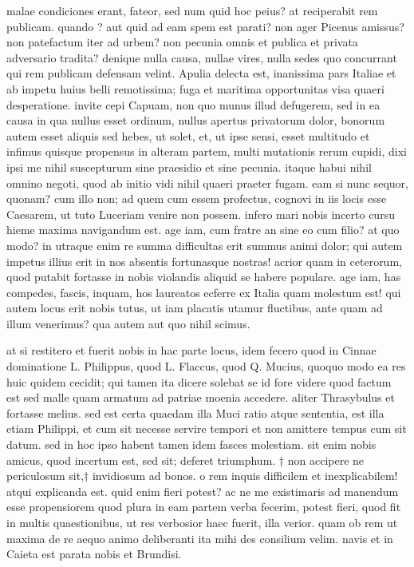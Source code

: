  malae condiciones erant, fateor, sed num quid hoc peius? at reciperabit rem publicam. quando ? aut quid ad eam spem est parati? non ager Picenus amissus? non patefactum iter ad urbem? non pecunia omnis et publica et privata adversario tradita? denique nulla causa, nullae vires, nulla sedes quo concurrant qui rem publicam defensam velint. Apulia delecta est, inanissima pars Italiae et ab impetu huius belli remotissima; fuga et maritima opportunitas visa quaeri desperatione. invite cepi Capuam, non quo munus illud defugerem, sed in ea causa in qua nullus esset ordinum, nullus apertus privatorum dolor, bonorum autem esset aliquis sed hebes, ut solet, et, ut ipse sensi, esset multitudo et infimus quisque propensus in alteram partem, multi mutationis rerum cupidi, dixi ipsi me nihil suscepturum sine praesidio et sine pecunia. itaque habui nihil omnino negoti, quod ab initio vidi nihil quaeri praeter fugam. eam si nunc sequor, quonam? cum illo non; ad quem cum essem profectus, cognovi in iis locis esse Caesarem, ut tuto Luceriam venire non possem. infero mari nobis incerto cursu hieme maxima navigandum est. age iam, cum fratre an sine eo cum filio? at quo modo? in utraque enim re summa difficultas erit summus animi dolor; qui autem impetus illius erit in nos absentis fortunasque nostras! acrior quam in ceterorum, quod putabit fortasse in nobis violandis aliquid se habere populare. age iam, has compedes, fascis, inquam, hos laureatos ecferre ex Italia quam molestum est! qui autem locus erit nobis tutus, ut iam placatis utamur fluctibus, ante quam ad illum venerimus? qua autem aut quo nihil scimus.

 at si restitero et fuerit nobis in hac parte locus, idem fecero quod in Cinnae dominatione L. Philippus, quod L. Flaccus, quod Q. Mucius, quoquo modo ea res huic quidem cecidit; qui tamen ita dicere solebat se id fore videre quod factum est sed malle quam armatum ad patriae moenia accedere. aliter Thrasybulus et fortasse melius. sed est certa quaedam illa Muci ratio atque sententia, est illa etiam Philippi, et cum sit necesse servire tempori et non amittere tempus cum sit datum. sed in hoc ipso habent tamen idem fasces molestiam. sit enim nobis amicus, quod incertum est, sed sit; deferet triumphum. † non accipere ne periculosum sit,† invidiosum ad bonos. o rem inquis difficilem et inexplicabilem! atqui explicanda est. quid enim fieri potest? ac ne me existimaris ad manendum esse propensiorem quod plura in eam partem verba fecerim, potest fieri, quod fit in multis quaestionibus, ut res verbosior haec fuerit, illa verior. quam ob rem ut maxima de re aequo animo deliberanti ita mihi des consilium velim. navis et in Caieta est parata nobis et Brundisi.

